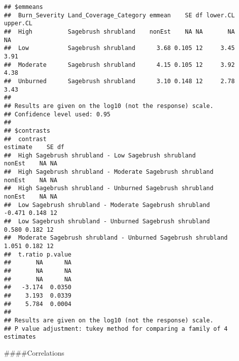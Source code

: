 \documentclass[
]{article}
\begin{document}
\begin{verbatim}
## $emmeans
##  Burn_Severity Land_Coverage_Category emmean    SE df lower.CL upper.CL
##  High          Sagebrush shrubland    nonEst    NA NA       NA       NA
##  Low           Sagebrush shrubland      3.68 0.105 12     3.45     3.91
##  Moderate      Sagebrush shrubland      4.15 0.105 12     3.92     4.38
##  Unburned      Sagebrush shrubland      3.10 0.148 12     2.78     3.43
## 
## Results are given on the log10 (not the response) scale. 
## Confidence level used: 0.95 
## 
## $contrasts
##  contrast                                                    estimate    SE df
##  High Sagebrush shrubland - Low Sagebrush shrubland            nonEst    NA NA
##  High Sagebrush shrubland - Moderate Sagebrush shrubland       nonEst    NA NA
##  High Sagebrush shrubland - Unburned Sagebrush shrubland       nonEst    NA NA
##  Low Sagebrush shrubland - Moderate Sagebrush shrubland        -0.471 0.148 12
##  Low Sagebrush shrubland - Unburned Sagebrush shrubland         0.580 0.182 12
##  Moderate Sagebrush shrubland - Unburned Sagebrush shrubland    1.051 0.182 12
##  t.ratio p.value
##       NA      NA
##       NA      NA
##       NA      NA
##   -3.174  0.0350
##    3.193  0.0339
##    5.784  0.0004
## 
## Results are given on the log10 (not the response) scale. 
## P value adjustment: tukey method for comparing a family of 4 estimates
\end{verbatim}

\#\#\#\#Correlations
\end{document}
